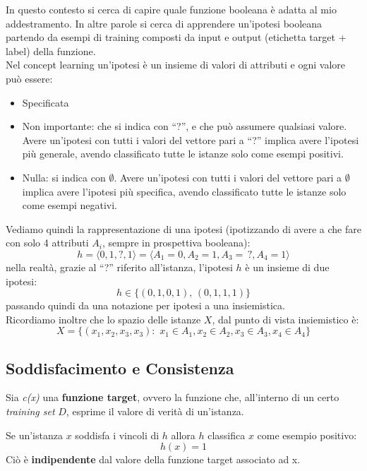 In questo contesto si cerca di capire quale funzione booleana è adatta al mio
addestramento. In altre parole si cerca di apprendere un'ipotesi booleana
partendo da esempi di training composti da input e output (etichetta target + label) della
funzione. \\
Nel concept learning un'ipotesi è un insieme di valori di attributi e ogni
valore può essere:
\begin{itemize}
  \item Specificata
  \item Non importante: che si indica con ``?'', e che può assumere qualsiasi
  valore. Avere un'ipotesi con tutti i valori del vettore pari a ``?'' implica
  avere l'ipotesi più generale, avendo classificato tutte le istanze solo come
  esempi positivi. 
  \item Nulla: si indica con $\emptyset$. Avere un'ipotesi con tutti i valori
  del vettore pari a $\emptyset$ implica avere l'ipotesi più specifica, avendo
  classificato tutte le istanze solo come esempi negativi. 
\end{itemize}
\begin{esempio}
  Vediamo quindi la rappresentazione di una ipotesi (ipotizzando di avere a che
  fare con solo 4 attributi $A_i$, sempre in prospettiva booleana):
  \[h=\langle 0, 1, ?, 1\rangle = \langle A_1=0, A_2=1, A_3=\,?, A_4=1\rangle\]
  nella realtà, grazie al ``?'' riferito all'istanza, l'ipotesi $h$ è un insieme
  di due ipotesi: 
  \[h\in\{(0, 1, 0, 1),\,(0, 1, 1, 1)\}\]
  passando quindi da una notazione per ipotesi a una insiemistica.\\
  Ricordiamo inoltre che lo spazio delle istanze $X$, dal punto di vista
  insiemistico è:
  \[X=\{(x_1,x_2,x_3,x_3): \,\,x_1\in A_1,x_2\in A_2, x_3\in A_3, x_4\in A_4\}\]
\end{esempio}

\subsection{Soddisfacimento e Consistenza}
Sia \textit{c(x)} una \textbf{funzione target}, ovvero la funzione che, all'interno di un certo \textit{training set} $D$, esprime il valore di verità di un'istanza.
\begin{definizione}
Se un'istanza $x$ soddisfa i vincoli di $h$ allora $h$ classifica $x$ come
esempio positivo:
\[h(x)=1\]  
Ciò è \textbf{indipendente} dal valore della funzione target associato ad x.
\end{definizione}

